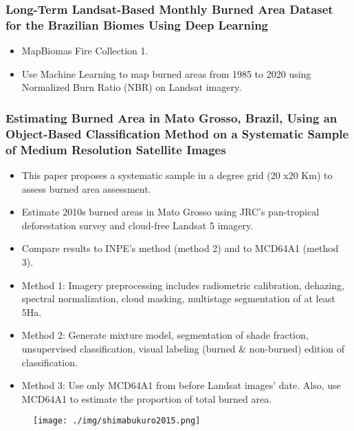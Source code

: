 \documentclass{beamer}
\begin{document}
\begin{frame}[t, allowframebreaks]
    \frametitle{Long-Term Landsat-Based Monthly Burned Area Dataset for 
            the Brazilian Biomes Using Deep Learning~\cite{alencar2022}}
    \begin{itemize}
        \item MapBiomas Fire Collection 1.
        \item Use Machine Learning to map burned areas from 1985 to 2020 using
            Normalized Burn Ratio (NBR) on Landsat imagery.
    \end{itemize}
\end{frame}



\begin{frame}[t, allowframebreaks]
    \frametitle{Estimating Burned Area in Mato Grosso, Brazil, Using an 
    Object-Based Classification Method on a Systematic Sample of Medium 
    Resolution Satellite Images~\cite{shimabukuro2015}}
    \begin{itemize}
        \item This paper proposes a systematic sample in a degree grid (20 x20 
            Km) to assess burned area assessment.
        \item Estimate 2010s burned areas in Mato Grosso using JRC's 
            pan-tropical deforestation survey and cloud-free Landsat 5 imagery.
        \item Compare results to INPE's method (method 2) and to MCD64A1 
            (method 3).
        \item Method 1: Imagery preprocessing includes radiometric calibration, 
            dehazing, spectral normalization, cloud masking, multistage 
            segmentation of at least 5Ha.
        \item Method 2: Generate mixture model, segmentation of shade fraction,
            unsupervised classification, visual labeling (burned \& non-burned)
            edition of classification.
        \item Method 3: Use only MCD64A1 from before Landsat images' date. 
            Also, use MCD64A1 to estimate the proportion of total burned area. 
    \end{itemize}
    \begin{figure}
        \centering
        \texttt{[image: ./img/shimabukuro2015.png]}
    \end{figure}
\end{frame}
\end{document}
